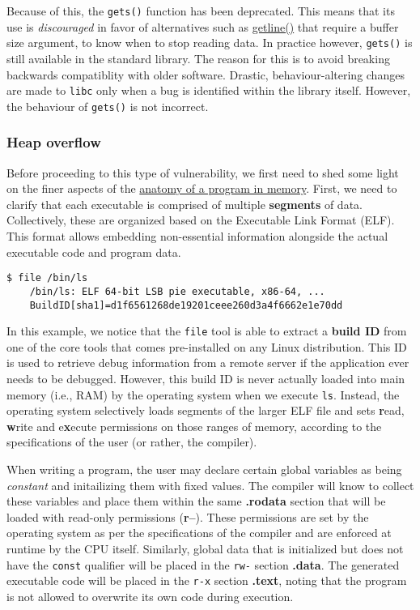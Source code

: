 Because of this, the \texttt{gets()} function has been deprecated. This means
that its use is \textit{discouraged} in favor of alternatives such as
\href{https://www.man7.org/linux/man-pages/man3/getline.3.html}{getline()}
that require a buffer size argument, to know when to stop reading data. In
practice however, \texttt{gets()} is still available in the standard library.
The reason for this is to avoid breaking backwards compatiblity with older
software. Drastic, behaviour-altering changes are made to \texttt{libc} only
when a bug is identified within the library itself. However, the behaviour of
\texttt{gets()} is not incorrect.

\subsubsection{Heap overflow}

Before proceeding to this type of vulnerability, we first need to shed some
light on the finer aspects of the
\href{https://olehslabak.medium.com/linux-for-dev-4-6f89616442b7}{anatomy of a
program in memory}. First, we need to clarify that each executable is comprised
of multiple \textbf{segments} of data. Collectively, these are organized based
on the Executable Link Format (ELF). This format allows embedding non-essential
information alongside the actual executable code and program data.

\begin{lstlisting}[style=bashstyle]
$ file /bin/ls
    /bin/ls: ELF 64-bit LSB pie executable, x86-64, ...
    BuildID[sha1]=d1f6561268de19201ceee260d3a4f6662e1e70dd
\end{lstlisting}

In this example, we notice that the \texttt{file} tool is able to extract a
\textbf{build ID} from one of the core tools that comes pre-installed on any
Linux distribution. This ID is used to retrieve debug information from a
remote server if the application ever needs to be debugged. However, this
build ID is never actually loaded into main memory (i.e., RAM) by the operating
system when we execute \texttt{ls}. Instead, the operating system selectively
loads segments of the larger ELF file and sets \textbf{r}ead, \textbf{w}rite
and e\textbf{x}ecute permissions on those ranges of memory, according to the
specifications of the user (or rather, the compiler).

When writing a program, the user may declare certain global variables as being
\textit{constant} and initailizing them with fixed values. The compiler will
know to collect these variables and place them within the same \textbf{.rodata}
section that will be loaded with read-only permissions (\textbf{r--}). These
permissions are set by the operating system as per the specifications of the
compiler and are enforced at runtime by the CPU itself. Similarly, global data
that is initialized but does not have the \texttt{const} qualifier will be
placed in the \texttt{rw-} section \textbf{.data}. The generated executable code
will be placed in the \texttt{r-x} section \textbf{.text}, noting that the
program is not allowed to overwrite its own code during execution.

